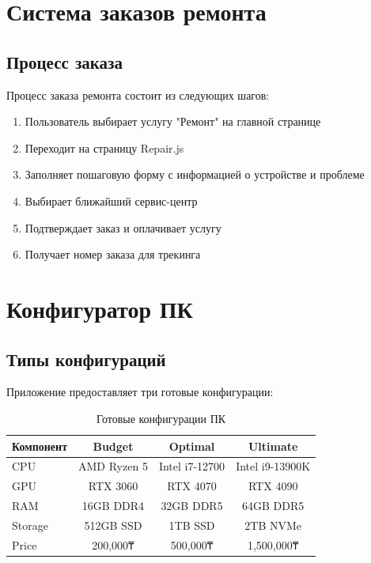 \documentclass[12pt,a4paper]{report}
\begin{document}
\section{Система заказов ремонта}

\subsection{Процесс заказа}
Процесс заказа ремонта состоит из следующих шагов:

\begin{enumerate}
    \item Пользователь выбирает услугу "Ремонт" на главной странице
    \item Переходит на страницу Repair.js
    \item Заполняет пошаговую форму с информацией о устройстве и проблеме
    \item Выбирает ближайший сервис-центр
    \item Подтверждает заказ и оплачивает услугу
    \item Получает номер заказа для трекинга
\end{enumerate}

\section{Конфигуратор ПК}

\subsection{Типы конфигураций}
Приложение предоставляет три готовые конфигурации:

\begin{table}[H]
\centering
\begin{tabular}{|l|c|c|c|}
\hline
\textbf{Компонент} & \textbf{Budget} & \textbf{Optimal} & \textbf{Ultimate} \\
\hline
CPU & AMD Ryzen 5 & Intel i7-12700 & Intel i9-13900K \\
GPU & RTX 3060 & RTX 4070 & RTX 4090 \\
RAM & 16GB DDR4 & 32GB DDR5 & 64GB DDR5 \\
Storage & 512GB SSD & 1TB SSD & 2TB NVMe \\
Price & 200,000₸ & 500,000₸ & 1,500,000₸ \\
\hline
\end{tabular}
\caption{Готовые конфигурации ПК}
\end{table}
\end{document}
